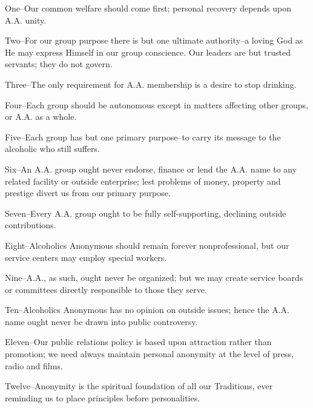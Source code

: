 \begin{biblechapter}
     
    One--Our common welfare should come first; 
    personal recovery depends upon A.A. unity.

\verse Two--For our group purpose there is but one ultimate 
    authority--a loving God as He may express Himself 
    in our group conscience.
    Our leaders are but trusted servants;
    they do not govern.

\verse Three--The only requirement for A.A. membership 
    is a desire to stop drinking.

\verse Four--Each group should be autonomous 
    except in matters affecting other groups, 
    or A.A. as a whole.

\verse Five--Each group has but one primary purpose--to
    carry its message to the alcoholic who still suffers.

\verse Six--An A.A. group ought never endorse, finance or lend
    the A.A. name to any related facility or outside enterprise;
    lest problems of money, property and prestige 
    divert us from our primary purpose.

\verse Seven--Every A.A. group ought to be fully self-supporting, 
    declining outside contributions.

\verse Eight--Alcoholics Anonymous should remain forever nonprofessional, 
    but our service centers may employ special workers.

\verse Nine--A.A., as such, ought never be organized; 
    but we may create service boards or committees 
    directly responsible to those they serve.

\verse Ten--Alcoholics Anonymous has no opinion on outside issues; 
    hence the A.A. name ought never be drawn into public controversy.

\verse Eleven--Our public relations policy is based upon attraction 
    rather than promotion; 
    we need always maintain personal anonymity 
    at the level of press, radio and films.

\verse Twelve--Anonymity is the spiritual foundation of all our Traditions, 
    ever reminding us to place principles before personalities.
\end{biblechapter}


